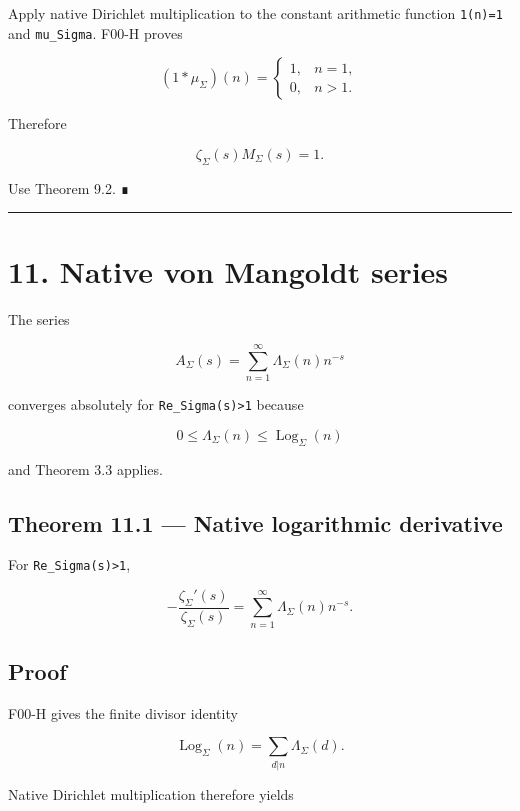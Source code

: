 Apply native Dirichlet multiplication to the constant arithmetic function
\texttt{1(n)=1} and \texttt{mu\_Sigma}. F00-H proves

\[
(1*\mu_\Sigma)(n)
=
\begin{cases}
1,&n=1,\\
0,&n>1.
\end{cases}
\]

Therefore

\[
\zeta_\Sigma(s)M_\Sigma(s)=1.
\]

Use Theorem 9.2. ∎

\begin{center}\rule{0.5\linewidth}{0.5pt}\end{center}

\hypertarget{native-von-mangoldt-series}{%
\section{11. Native von Mangoldt series}\label{native-von-mangoldt-series}}

The series

\[
A_\Sigma(s)
=
\sum_{n=1}^{\infty}
\Lambda_\Sigma(n)n^{-s}
\]

converges absolutely for \texttt{Re\_Sigma(s)\textgreater{}1} because

\[
0\le\Lambda_\Sigma(n)
\le\operatorname{Log}_\Sigma(n)
\]

and Theorem 3.3 applies.

\hypertarget{theorem-11.1-native-logarithmic-derivative}{%
\subsection{Theorem 11.1 --- Native logarithmic derivative}\label{theorem-11.1-native-logarithmic-derivative}}

For \texttt{Re\_Sigma(s)\textgreater{}1},

\[
\boxed{
-
\frac{\zeta_\Sigma'(s)}{\zeta_\Sigma(s)}
=
\sum_{n=1}^{\infty}
\Lambda_\Sigma(n)n^{-s}.
}
\]

\hypertarget{proof-15}{%
\subsection{Proof}\label{proof-15}}

F00-H gives the finite divisor identity

\[
\operatorname{Log}_\Sigma(n)
=
\sum_{d|n}\Lambda_\Sigma(d).
\]

Native Dirichlet multiplication therefore yields


